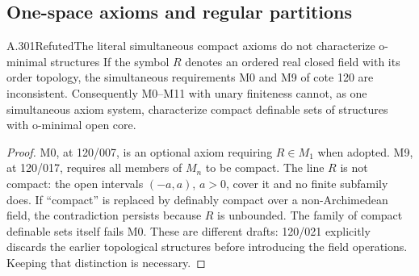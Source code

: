 \subsection{One-space axioms and regular partitions}

\begin{saresult}{A.301}{Refuted}{The literal simultaneous compact axioms do not characterize o-minimal structures}
If the symbol $R$ denotes an ordered real closed field with its order topology,
the simultaneous requirements M0 and M9 of cote 120 are inconsistent.
Consequently M0--M11 with unary finiteness cannot, as one simultaneous axiom
system, characterize compact definable sets of structures with o-minimal open core.
\end{saresult}
\begin{proof}
M0, at 120/007, is an optional axiom requiring $R\in M_1$ when adopted.
M9, at 120/017, requires all
members of $M_n$ to be compact. The line $R$ is not compact: the open
intervals $(-a,a)$, $a>0$, cover it and no finite subfamily does. If
``compact'' is replaced by definably compact over a non-Archimedean
field, the contradiction persists because $R$ is unbounded. The family
of compact definable sets itself fails M0. These are different drafts:
120/021 explicitly discards the earlier topological structures before
introducing the field operations. Keeping that distinction is necessary.
\end{proof}

